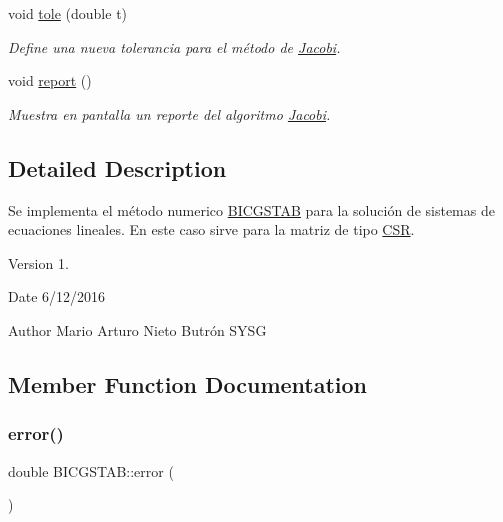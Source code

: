 \begin{DoxyCompactItemize}
void \hyperlink{class_b_i_c_g_s_t_a_b_ab0a72020c9ea0f2fecf806e973c1b41e}{tole} (double t)
\begin{DoxyCompactList}\small\item\em Define una nueva tolerancia para el método de \hyperlink{class_jacobi}{Jacobi}. \end{DoxyCompactList}\item 
void \hyperlink{class_b_i_c_g_s_t_a_b_a5ebc32bd9c0892557018802781f7c65a}{report} ()
\begin{DoxyCompactList}\small\item\em Muestra en pantalla un reporte del algoritmo \hyperlink{class_jacobi}{Jacobi}. \end{DoxyCompactList}\end{DoxyCompactItemize}


\subsection{Detailed Description}
Se implementa el método numerico \hyperlink{class_b_i_c_g_s_t_a_b}{B\+I\+C\+G\+S\+T\+AB} para la solución de sistemas de ecuaciones lineales. En este caso sirve para la matriz de tipo \hyperlink{class_c_s_r}{C\+SR}. 

\begin{DoxyVersion}{Version}
1. 
\end{DoxyVersion}
\begin{DoxyDate}{Date}
6/12/2016 
\end{DoxyDate}
\begin{DoxyAuthor}{Author}
Mario Arturo Nieto Butrón  S\+Y\+SG 
\end{DoxyAuthor}


\subsection{Member Function Documentation}
\hypertarget{class_b_i_c_g_s_t_a_b_adc1e9aff5858970c125b18d0ab5ea52b}{}\label{class_b_i_c_g_s_t_a_b_adc1e9aff5858970c125b18d0ab5ea52b} 
\subsubsection{\texorpdfstring{error()}{error()}}
{\footnotesize\ttfamily double B\+I\+C\+G\+S\+T\+A\+B\+::error (\begin{DoxyParamCaption}{ }\end{DoxyParamCaption})\hspace{0.3cm}{\ttfamily [inline]}}



